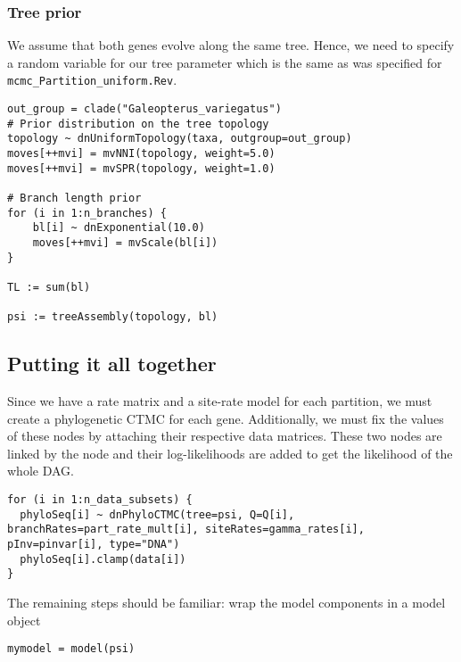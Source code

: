\subsubsection{Tree prior}

We assume that both genes evolve along the same tree.
Hence, we need to specify a random variable for our tree parameter which is the same as was specified for {\tt mcmc\_Partition\_uniform.Rev}.
{\tt \begin{snugshade*}
\begin{lstlisting}
out_group = clade("Galeopterus_variegatus")
# Prior distribution on the tree topology	
topology ~ dnUniformTopology(taxa, outgroup=out_group)
moves[++mvi] = mvNNI(topology, weight=5.0)
moves[++mvi] = mvSPR(topology, weight=1.0)

# Branch length prior
for (i in 1:n_branches) {
    bl[i] ~ dnExponential(10.0)
	moves[++mvi] = mvScale(bl[i])
}

TL := sum(bl)
	
psi := treeAssembly(topology, bl)
\end{lstlisting}
\end{snugshade*}}


\subsection{Putting it all together}

Since we have a rate matrix and a site-rate model for each partition, we must create a phylogenetic CTMC for each gene. 
Additionally, we must fix the values of these nodes by attaching their respective data matrices.
These two nodes are linked by the  node and their log-likelihoods are added to get the likelihood of the whole DAG.
{\tt \begin{snugshade*}
\begin{lstlisting}
for (i in 1:n_data_subsets) {
  phyloSeq[i] ~ dnPhyloCTMC(tree=psi, Q=Q[i], branchRates=part_rate_mult[i], siteRates=gamma_rates[i], pInv=pinvar[i], type="DNA")
  phyloSeq[i].clamp(data[i])
}
\end{lstlisting}
\end{snugshade*}}

The remaining steps should be familiar:
wrap the model components in a model object

{\tt \begin{snugshade*}
\begin{lstlisting}
mymodel = model(psi)
\end{lstlisting}
\end{snugshade*}}

